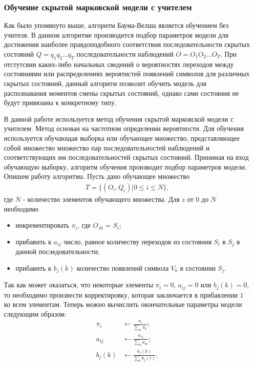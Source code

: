 \subsubsection{Обучение скрытой марковской модели с учителем}
Как было упомянуто выше, алгоритм Баума-Велша является обучением без учителя. В данном алгоритме производится подбор параметров модели для достижения наиболее правдоподобного соответствия последовательности скрытых состояний \(Q=q_1q_2...q_T\) последовательности наблюдений \(O=O_1O_2...O_T\). При отстутсвии каких-либо начальных сведений о вероятностях переходов между состояниями или распределениях вероятнстей появлений символов для различных скрытых состояний, данный алгоритм позволит обучить модель для распознавания моментов смены скрытых состояний, однако сами состояния не будут привязаны к конкретному типу.

В данной работе используется метод обучения скрытой марковской модели с учителем. Метод основан на частотном определении вероятности. Для обучения используется обучающая выборка или обучающее множество, представляющее собой множество множество пар последовательностей наблюдений и соответствующих им последовательностей скрытых состояний. Принимая на вход обучающую выборку, алгоритм обучения производит подбор параметров модели. Опишем работу алгоритма. Пусть дано обучающее множество
\begin{align}
T = \{(O_i, Q_i) | 0 \le i \le N\} \text{,}
\end{align}
где \(N\) - количество элементов обучающего множества. Для \(z\) от \(0\) до \(N\) необходимо
\begin{itemize}
\item
инкрементировать \(\pi_i\), где \(O_{z0}\) = \(S_i\);
\item
прибавить к \(a_{ij}\) число, равное количеству переходов из состояния \(S_i\) в \(S_j\) в данной последовательности;
\item
прибавить к \(b_j(k)\) количество появлений символа \(V_k\) в состоянии \(S_j\).
\end{itemize}
Так как может оказаться, что некоторые элементы \(\pi_i = 0\), \(a_{ij} = 0\) или \(b_j(k) = 0\), то необходимо произвести корректировку, которая заключается в прибавлении \(1\) ко всем элементам.
Теперь можно вычислить окончательные параметры модели следующим образом:
\begin{align}
	\pi_i &\leftarrow \frac{\pi_i}{\displaystyle\sum_{k} \pi_k}; \\
	a_{ij} &\leftarrow \frac{a_{ij}}{\displaystyle\sum_{k} a_{ik}}; \\
	b_j(k) &\leftarrow \frac{b_j(k)}{\displaystyle\sum_{t} b_j(t)}.
\end{align}

